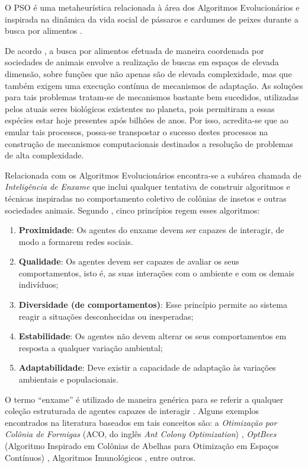 \documentclass[
	12pt,				%
	openany,			%
	oneside,	
	a4paper,			%
	brazil,				%
	]{unimontes-ppgmsc-abntex2}
\begin{document}
O PSO é uma metaheurística relacionada à área dos Algoritmos Evolucionários e inspirada na dinâmica da vida social de pássaros e cardumes de peixes durante a busca por alimentos \cite{Kennedy_1995}.

De acordo , a busca por alimentos efetuada de maneira coordenada por sociedades de animais envolve a realização de buscas em espaços de elevada dimensão, sobre funções que não apenas são de elevada complexidade, mas que também exigem uma execução contínua de mecanismos de adaptação. As soluções para tais problemas tratam-se de mecanismos bastante bem sucedidos, utilizadas pelos atuais seres biológicos existentes no planeta, pois permitiram a essas espécies estar hoje presentes após bilhões de anos. Por isso, acredita-se que ao emular tais processos, possa-se transpostar o sucesso destes processos na construção de mecanismos computacionais destinados a resolução de problemas de alta complexidade.
 
Relacionada com os Algoritmos Evolucionários encontra-se a subárea chamada de {\em Inteligência de Enxame} que inclui qualquer tentativa de construir algoritmos e técnicas inspiradas no comportamento coletivo de colônias de insetos e outras sociedades animais. Segundo , cinco princípios regem esses algoritmos:

\begin{enumerate}[label=(\roman*)]
\item \textbf{Proximidade}: Os agentes do enxame devem ser capazes de interagir, de modo a formarem redes sociais.
\item \textbf{Qualidade}: Os agentes devem ser capazes de avaliar os seus comportamentos, isto é, as suas interações com o ambiente e com os demais indivíduos;
\item \textbf{Diversidade (de comportamentos)}: Esse princípio permite ao sistema reagir a situações desconhecidas ou inesperadas;
\item \textbf{Estabilidade}: Os agentes não devem  alterar os seus comportamentos em resposta a qualquer variação ambiental;
\item \textbf{Adaptabilidade}: Deve existir a capacidade de adaptação às variações ambientais e populacionais.
\end{enumerate}

O termo ``enxame'' é utilizado de maneira genérica para se  referir a qualquer coleção estruturada de agentes capazes de interagir \cite{VonZuben_2007}. Alguns exemplos encontrados na literatura baseados em tais conceitos são: a {\em Otimização por Colônia de Formigas} (ACO, do inglês {\em Ant Colony Optimization}) \cite{Dorigo_1996}, {\em OptBees} (Algoritmo Inspirado em Colônias de Abelhas para Otimização em Espaços Contínuos) \cite{Renato_2013}, Algoritmos Imunológicos \cite{Castro_2002}, entre outros. 
\end{document}
